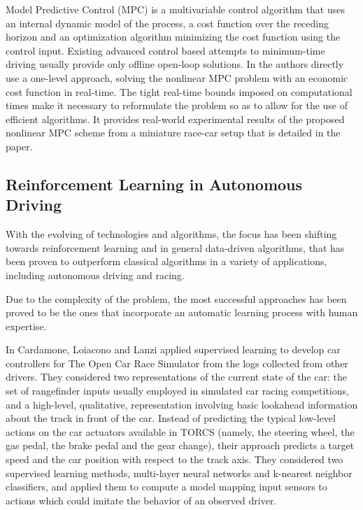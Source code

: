 Model Predictive Control (MPC) \cite{mpc_orig} is a multivariable control algorithm that uses an internal dynamic model of the process, a cost function over the receding horizon and an optimization algorithm minimizing the cost function using the control input. Existing advanced control based attempts to minimum-time driving usually provide only offline open-loop solutions. In the authors directly use a one-level approach, solving the nonlinear MPC problem with an economic cost function in real-time. The tight real-time bounds imposed on computational times make it necessary to reformulate the problem so as to allow for the use of efficient algorithms.
It provides real-world experimental results of the proposed nonlinear MPC scheme from a miniature race-car setup that is detailed in the paper. 

\subsection{Reinforcement Learning in Autonomous Driving}

With the evolving of technologies and algorithms, the focus has been shifting towards reinforcement learning and in general data-driven algorithms, that has been proven to outperform classical algorithms in a variety of applications, including autonomous driving and racing.

Due to the complexity of the problem, the most successful approaches has been proved to be the ones that incorporate an automatic learning process with human expertise.

In \cite{cardamone} Cardamone, Loiacono and Lanzi applied supervised learning to develop car controllers for The Open Car Race Simulator from the logs collected from other drivers. 
They considered two representations of the current state of the car: the set of rangefinder inputs usually employed in simulated car racing competitions, and a high-level, qualitative, representation involving basic lookahead information about the track in front of the car. Instead of predicting the typical low-level actions on the car actuators available in TORCS (namely, the steering wheel, the gas pedal, the brake pedal and the gear change), their approach predicts a target speed and the car position with respect to the track axis.
They considered two supervised learning methods, multi-layer neural networks and k-nearest neighbor classifiers, and applied them to compute a model mapping input sensors to actions which could imitate the behavior of an observed driver.

